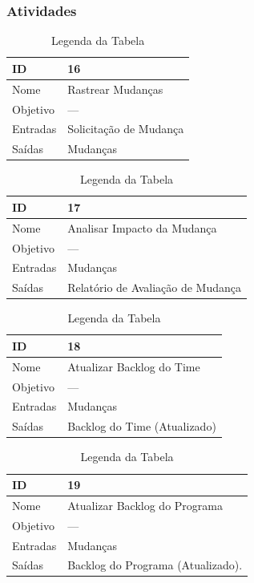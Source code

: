 \subsubsection{Atividades}

\begin{table}[H]
  \centering
    \begin{tabular}{| m{5em} | m{10cm} |}
      \hline
      ID       & 16   \\ \hline
      Nome     & Rastrear Mudanças  \\ \hline
      Objetivo & ---  \\ \hline
      Entradas & Solicitação de Mudança\\ \hline
      Saídas   & Mudanças \\ \hline
    \end{tabular}
    \caption{Legenda da Tabela}
    \label{tabela:atividade16}
\end{table}

\begin{table}[H]
  \centering
    \begin{tabular}{| m{5em} | m{10cm} |}
      \hline
      ID       & 17   \\ \hline
      Nome     & Analisar Impacto da Mudança \\ \hline
      Objetivo & ---  \\ \hline
      Entradas & Mudanças \\ \hline
      Saídas   & Relatório de Avaliação de Mudança \\ \hline
    \end{tabular}
    \caption{Legenda da Tabela}
    \label{tabela:atividade17}
\end{table}

\begin{table}[H]
  \centering
    \begin{tabular}{| m{5em} | m{10cm} |}
      \hline
      ID       & 18   \\ \hline
      Nome     & Atualizar Backlog do Time  \\ \hline
      Objetivo & ---  \\ \hline
      Entradas & Mudanças \\ \hline
      Saídas   & Backlog do Time (Atualizado) \\ \hline
    \end{tabular}
    \caption{Legenda da Tabela}
    \label{tabela:atividade18}
\end{table}

\begin{table}[H]
  \centering
    \begin{tabular}{| m{5em} | m{10cm} |}
      \hline
      ID       & 19   \\ \hline
      Nome     & Atualizar Backlog do Programa  \\ \hline
      Objetivo & ---  \\ \hline
      Entradas & Mudanças\\ \hline
      Saídas   & Backlog do Programa (Atualizado). \\ \hline
    \end{tabular}
    \caption{Legenda da Tabela}
    \label{tabela:atividade19}
\end{table}

